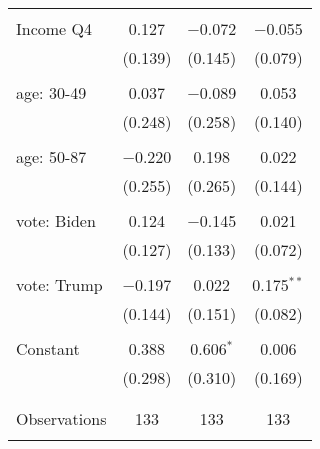 \begin{tabular}{@{\extracolsep{5pt}}lccc}
  & & & \\ 
 Income Q4 & 0.127 & $-$0.072 & $-$0.055 \\ 
  & (0.139) & (0.145) & (0.079) \\ 
  & & & \\ 
 age: 30-49 & 0.037 & $-$0.089 & 0.053 \\ 
  & (0.248) & (0.258) & (0.140) \\ 
  & & & \\ 
 age: 50-87 & $-$0.220 & 0.198 & 0.022 \\ 
  & (0.255) & (0.265) & (0.144) \\ 
  & & & \\ 
 vote: Biden & 0.124 & $-$0.145 & 0.021 \\ 
  & (0.127) & (0.133) & (0.072) \\ 
  & & & \\ 
 vote: Trump & $-$0.197 & 0.022 & 0.175$^{**}$ \\ 
  & (0.144) & (0.151) & (0.082) \\ 
  & & & \\ 
 Constant & 0.388 & 0.606$^{*}$ & 0.006 \\ 
  & (0.298) & (0.310) & (0.169) \\ 
  & & & \\ 
\hline \\[-1.8ex] 

Observations & 133 & 133 & 133 \\ 
\hline 
\hline \\[-1.8ex] 
\end{tabular} 
